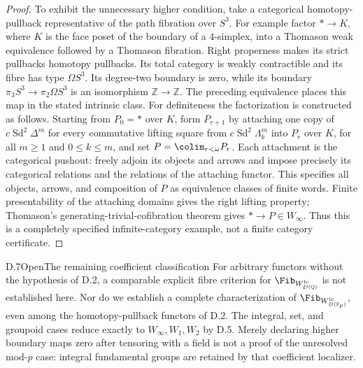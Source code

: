 \begin{proof}
To exhibit the unnecessary higher condition, take a categorical homotopy-pullback representative of the path fibration over $S^3$. For example factor $*\to K$, where $K$ is the face poset of the boundary of a $4$-simplex, into a Thomason weak equivalence followed by a Thomason fibration. Right properness makes its strict pullbacks homotopy pullbacks. Its total category is weakly contractible and its fibre has type $\Omega S^3$. Its degree-two boundary is zero, while its boundary $\pi_3S^3\to\pi_2\Omega S^3$ is an isomorphism $\mathbb Z\to\mathbb Z$. The preceding equivalence places this map in the stated intrinsic class. For definiteness the factorization is constructed as follows. Starting from $P_0=*$ over $K$, form $P_{r+1}$ by attaching one copy of $c\operatorname{Sd}^2\Delta^m$ for every commutative lifting square from $c\operatorname{Sd}^2\Lambda_k^m$ into $P_r$ over $K$, for all $m\geq1$ and $0\leq k\leq m$, and set $P=\colim_{r<\omega}P_r$. Each attachment is the categorical pushout: freely adjoin its objects and arrows and impose precisely its categorical relations and the relations of the attaching functor. This specifies all objects, arrows, and composition of $P$ as equivalence classes of finite words. Finite presentability of the attaching domains gives the right lifting property; Thomason's generating-trivial-cofibration theorem gives $*\to P\in W_\infty$. Thus this is a completely specified infinite-category example, not a finite category certificate.
\end{proof}

\begin{claim}{D.7}{Open}{The remaining coefficient classification}
For arbitrary functors without the hypothesis of D.2, a comparable explicit fibre criterion for $\Fib_{W_{D(\mathbb Q)}^{\mathrm{lc}}}$ is not established here. Nor do we establish a complete characterization of $\Fib_{W_{D(\mathbb F_p)}^{\mathrm{lc}}}$, even among the homotopy-pullback functors of D.2. The integral, set, and groupoid cases reduce exactly to $W_\infty,W_1,W_2$ by D.5. Merely declaring higher boundary maps zero after tensoring with a field is not a proof of the unresolved mod-$p$ case: integral fundamental groups are retained by that coefficient localizer.
\end{claim}

